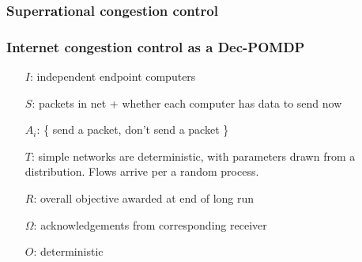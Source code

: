 \documentclass[svgnames]{beamer}
\newcommand{\ssline}{\vspace{8 pt}}
\begin{document}
\begin{frame}
\frametitle{Super\textcolor{Black}{rat}ional congestion control}

\begin{centering}

\ssline
\ssline
\ssline

\end{centering}


\end{frame}

\begin{frame}
\frametitle{Internet congestion control as a Dec-POMDP}

\begin{itemize}

\item[$I$:] independent endpoint computers

\pause

\item[$S$:] packets in net + whether each computer has data to send now

\pause

\item[$A_i$:] \{ send a packet, don't send a packet \}

\pause

\item[$T$:] simple networks are deterministic, with parameters drawn from a distribution. Flows arrive per a random process.

\pause

\item[$R$:] overall objective awarded at end of long run

\pause

\item[$\Omega$:] acknowledgements from corresponding receiver

\pause

\item[$O$:] deterministic

\item[]

\pause

\item[] 

\end{itemize}

\end{frame}
\end{document}
